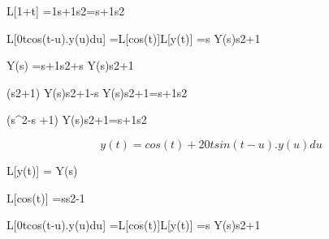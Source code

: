 L[1+t] =1s+1s2=s+1s2

 

L[0tcos(t-u).y(u)du] =L[cos(t)]L[y(t)] =s Y(s)s2+1

 

Y(s) =s+1s2+s Y(s)s2+1

 

(s2+1) Y(s)s2+1-s Y(s)s2+1=s+1s2

 

(s^2-s +1) Y(s)s2+1=s+1s2

 

 


 \[ y(t) = cos(t)+ 20tsin(t-u).y(u)du\]


 

 

L[y(t)] = Y(s)

 

L[cos(t)] =ss2-1

 

L[0tcos(t-u).y(u)du] =L[cos(t)]L[y(t)] =s Y(s)s2+1



